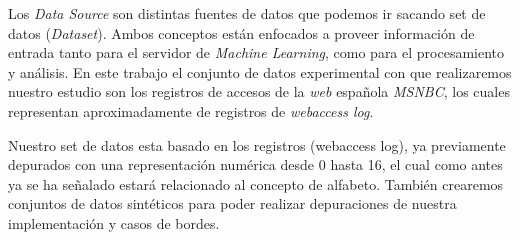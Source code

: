 
Los \emph{Data Source} son distintas fuentes de datos que podemos ir sacando set de datos (\emph{Dataset}). Ambos conceptos están enfocados a proveer información de entrada tanto para el servidor de \emph{Machine Learning}, como para el procesamiento y análisis.
En este trabajo el conjunto de datos experimental con que realizaremos nuestro estudio son los registros de accesos de la \emph{web} española \emph{MSNBC}\cite{Claude2014}, los cuales representan aproximadamente de registros de \emph{webaccess log}.

Nuestro set de  datos esta basado en los registros (webaccess log), ya previamente depurados con una representación numérica desde 0 hasta 16, el cual como antes ya se ha señalado estará relacionado al concepto de alfabeto. También crearemos conjuntos de datos sintéticos para poder realizar depuraciones de nuestra implementación y casos de bordes.
	
	 
